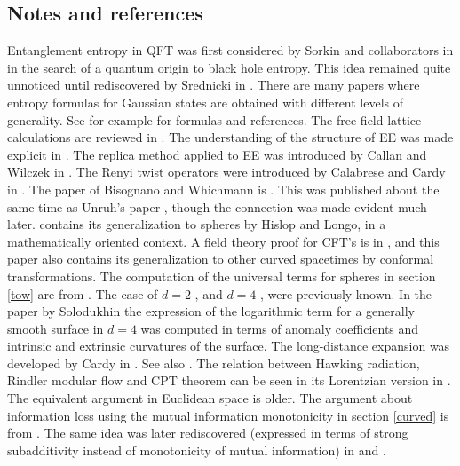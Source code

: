 \documentclass[11pt]{article}
\numberwithin{equation}{section}
\begin{document}
\subsection{Notes and references}
Entanglement entropy in QFT was first considered by Sorkin and collaborators in \cite{Sorkin:2014kta,Bombelli:1986rw} in the search of a quantum origin to black hole entropy. This idea remained quite unnoticed until rediscovered by Srednicki in \cite{Srednicki:1993im}. 
There are many papers where entropy formulas for Gaussian states are obtained with different levels of generality. See for example  \cite{peschel2009reduced} for formulas and references. 
The free field lattice calculations are reviewed in \cite{Casini:2009sr}. The understanding of the structure of EE was made explicit in  \cite{Liu:2012eea,Grover:2011fa}. The replica method applied to EE was introduced by Callan and Wilczek in \cite{Callan:1994py}. The Renyi twist operators were introduced by Calabrese and Cardy in \cite{Calabrese:2004eu}. The paper of Bisognano and Whichmann 
 is \cite{Bisognano:1975ih}. This was published about the same time as Unruh's paper  \cite{unruh1976notes}, though the connection was made evident much later.  
 \cite{Hislop:1981uh} contains its generalization to spheres by Hislop and Longo, in a mathematically oriented context. A field theory proof for CFT's is in \cite{Casini:2011kv}, and this paper also contains its generalization to other curved spacetimes by conformal transformations. The computation of the universal terms for spheres in section \ref{tow} are from \cite{Casini:2011kv}. The case of $d=2$ \cite{Holzhey:1994we}, and $d=4$ \cite{Solodukhin:2008dh}, were previously known. In the paper by Solodukhin \cite{Solodukhin:2008dh} the expression of the logarithmic term for a generally smooth surface in $d=4$ was computed in terms of anomaly coefficients and intrinsic and extrinsic curvatures of the surface. The long-distance expansion was developed by Cardy in \cite{Cardy.esferaslejanas}. See also \cite{Agon:2015ftl}. The relation between Hawking radiation, Rindler modular flow and CPT theorem can be seen in its Lorentzian version in \cite{sewell1982quantum}. The equivalent argument in Euclidean space is older. The argument about information loss using the mutual information monotonicity in section \ref{curved} is from \cite{Casini:2007dk}.        The same idea was later rediscovered (expressed in terms of strong subadditivity instead of monotonicity of mutual information) in \cite{Mathur:2009hf} and \cite{Almheiri:2012rt}. 
\end{document}
